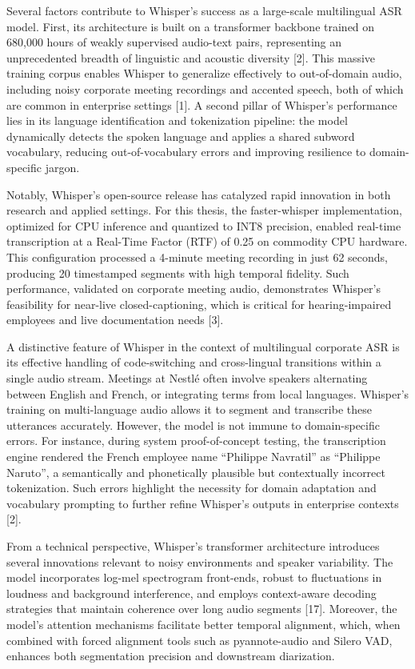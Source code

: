 \documentclass[12pt,a4paper]{article}
\begin{document}
Several factors contribute to Whisper’s success as a large-scale multilingual ASR model. First, its architecture is built on a transformer backbone trained on 680,000 hours of weakly supervised audio-text pairs, representing an unprecedented breadth of linguistic and acoustic diversity [2]. This massive training corpus enables Whisper to generalize effectively to out-of-domain audio, including noisy corporate meeting recordings and accented speech, both of which are common in enterprise settings [1]. A second pillar of Whisper’s performance lies in its language identification and tokenization pipeline: the model dynamically detects the spoken language and applies a shared subword vocabulary, reducing out-of-vocabulary errors and improving resilience to domain-specific jargon.


Notably, Whisper’s open-source release has catalyzed rapid innovation in both research and applied settings. For this thesis, the faster-whisper implementation, optimized for CPU inference and quantized to INT8 precision, enabled real-time transcription at a Real-Time Factor (RTF) of 0.25 on commodity CPU hardware. This configuration processed a 4-minute meeting recording in just 62 seconds, producing 20 timestamped segments with high temporal fidelity. Such performance, validated on corporate meeting audio, demonstrates Whisper’s feasibility for near-live closed-captioning, which is critical for hearing-impaired employees and live documentation needs [3].


A distinctive feature of Whisper in the context of multilingual corporate ASR is its effective handling of code-switching and cross-lingual transitions within a single audio stream. Meetings at Nestlé often involve speakers alternating between English and French, or integrating terms from local languages. Whisper’s training on multi-language audio allows it to segment and transcribe these utterances accurately. However, the model is not immune to domain-specific errors. For instance, during system proof-of-concept testing, the transcription engine rendered the French employee name “Philippe Navratil” as “Philippe Naruto”, a semantically and phonetically plausible but contextually incorrect tokenization. Such errors highlight the necessity for domain adaptation and vocabulary prompting to further refine Whisper’s outputs in enterprise contexts [2].


From a technical perspective, Whisper’s transformer architecture introduces several innovations relevant to noisy environments and speaker variability. The model incorporates log-mel spectrogram front-ends, robust to fluctuations in loudness and background interference, and employs context-aware decoding strategies that maintain coherence over long audio segments [17]. Moreover, the model’s attention mechanisms facilitate better temporal alignment, which, when combined with forced alignment tools such as pyannote-audio and Silero VAD, enhances both segmentation precision and downstream diarization.
\end{document}

